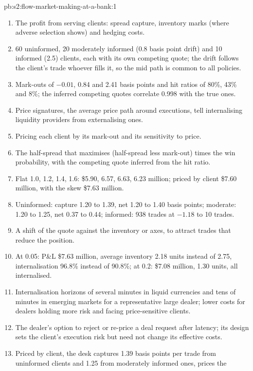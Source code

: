 \begin{solution}{pb:s2:flow-market-making-at-a-bank:1}
\begin{enumerate}
\item The profit from serving clients: spread capture, inventory marks (where adverse selection shows) and hedging costs.
\item 60 uninformed, 20 moderately informed (0.8 basis point drift) and 10 informed (2.5) clients, each with its own competing quote; the drift follows
the client's trade whoever fills it, so the mid path is common to all policies.
\item Mark-outs of $-0.01$, 0.84 and 2.41 basis points and hit ratios of 80\%, 43\% and 8\%; the inferred competing quotes correlate 0.998 with the
true ones.
\item Price signatures, the average price path around executions, tell internalising liquidity providers from externalising ones.
\item Pricing each client by its mark-out and its sensitivity to price.
\item The half-spread that maximises (half-spread less mark-out) times the win probability, with the competing quote inferred from the hit ratio.
\item Flat 1.0, 1.2, 1.4, 1.6: \$5.90, 6.57, 6.63, 6.23 million; priced by client \$7.60 million, with the skew \$7.63 million.
\item Uninformed: capture 1.20 to 1.39, net 1.20 to 1.40 basis points; moderate: 1.20 to 1.25, net 0.37 to 0.44; informed: 938 trades at $-1.18$ to
10 trades.
\item A shift of the quote against the inventory or axes, to attract trades that reduce the position.
\item At 0.05: P\&L \$7.63 million, average inventory 2.18 units instead of 2.75, internalisation 96.8\% instead of 90.8\%; at 0.2: \$7.08 million,
1.30 units, all internalised.
\item Internalisation horizons of several minutes in liquid currencies and tens of minutes in emerging markets for a representative large dealer;
lower costs for dealers holding more risk and facing price-sensitive clients.
\item The dealer's option to reject or re-price a deal request after latency; its design sets the client's execution risk but need not change its
effective costs.
\item Priced by client, the desk captures 1.39 basis points per trade from uninformed clients and 1.25 from moderately informed ones, prices the

\end{enumerate}
\end{solution}
